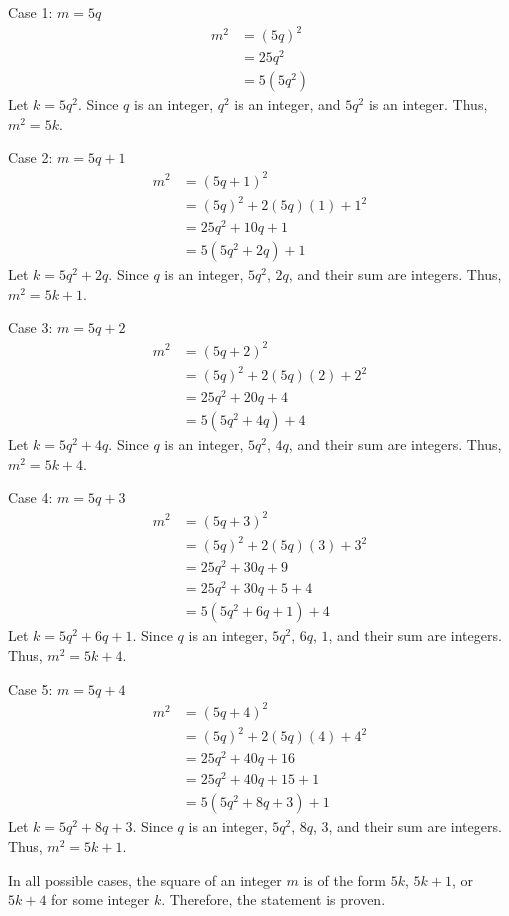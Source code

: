 \documentclass{article}
\begin{document}
Case 1: $m = 5q$
\begin{align*} m^2 &= (5q)^2 \\ &= 25q^2 \\ &= 5(5q^2)\end{align*}
Let $k = 5q^2$. Since $q$ is an integer, $q^2$ is an integer, and $5q^2$ is an integer. Thus, $m^2 = 5k$.

Case 2: $m = 5q+1$
\begin{align*} m^2 &= (5q+1)^2 \\ &= (5q)^2 + 2(5q)(1) + 1^2 \\ &= 25q^2 + 10q + 1 \\ &= 5(5q^2 + 2q) + 1\end{align*}
Let $k = 5q^2 + 2q$. Since $q$ is an integer, $5q^2$, $2q$, and their sum are integers. Thus, $m^2 = 5k+1$.

Case 3: $m = 5q+2$
\begin{align*} m^2 &= (5q+2)^2 \\ &= (5q)^2 + 2(5q)(2) + 2^2 \\ &= 25q^2 + 20q + 4 \\ &= 5(5q^2 + 4q) + 4\end{align*}
Let $k = 5q^2 + 4q$. Since $q$ is an integer, $5q^2$, $4q$, and their sum are integers. Thus, $m^2 = 5k+4$.

Case 4: $m = 5q+3$
\begin{align*} m^2 &= (5q+3)^2 \\ &= (5q)^2 + 2(5q)(3) + 3^2 \\ &= 25q^2 + 30q + 9 \\ &= 25q^2 + 30q + 5 + 4 \\ &= 5(5q^2 + 6q + 1) + 4\end{align*}
Let $k = 5q^2 + 6q + 1$. Since $q$ is an integer, $5q^2$, $6q$, $1$, and their sum are integers. Thus, $m^2 = 5k+4$.

Case 5: $m = 5q+4$
\begin{align*} m^2 &= (5q+4)^2 \\ &= (5q)^2 + 2(5q)(4) + 4^2 \\ &= 25q^2 + 40q + 16 \\ &= 25q^2 + 40q + 15 + 1 \\ &= 5(5q^2 + 8q + 3) + 1\end{align*}
Let $k = 5q^2 + 8q + 3$. Since $q$ is an integer, $5q^2$, $8q$, $3$, and their sum are integers. Thus, $m^2 = 5k+1$.

In all possible cases, the square of an integer $m$ is of the form $5k$, $5k+1$, or $5k+4$ for some integer $k$. Therefore, the statement is proven.
\end{document}
